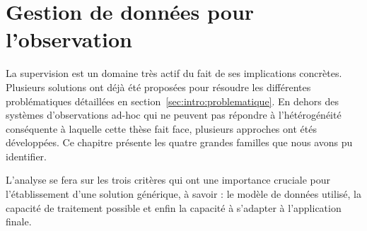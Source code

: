 \chapter{Gestion de données pour l'observation}
\minitoc

La supervision est un domaine très actif du fait de ses implications concrètes. Plusieurs solutions ont déjà été proposées pour résoudre les différentes problématiques détaillées en section~\ref{sec:intro:problematique}. En dehors des systèmes d'observations ad-hoc qui ne peuvent pas répondre à l'hétérogénéité conséquente à laquelle cette thèse fait face, plusieurs approches ont étés développées. Ce chapitre présente les quatre grandes familles que nous avons pu identifier.

L'analyse se fera sur les trois critères qui ont une importance cruciale pour l'établissement d'une solution générique, à savoir : le modèle de données utilisé, la capacité de traitement possible et enfin la capacité à s'adapter à l'application finale.








